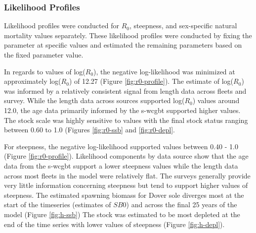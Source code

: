 \documentclass[11pt,
  english,
  a4paper,
]{article}
\begin{document}
\leavevmode\tagmcend\tagstructend\par


\hypertarget{likelihood-profiles}{%
\subsubsection{Likelihood Profiles}\label{likelihood-profiles}}

\leavevmode\tagmcend\tagstructend


Likelihood profiles were conducted for {\(R_0\)\leavevmode\tagmcend\tagstructend}, steepness, and sex-specific natural mortality values separately. These likelihood profiles were conducted by fixing the parameter at specific values and estimated the remaining parameters based on the fixed parameter value.

\leavevmode\tagmcend\tagstructend\par


In regards to values of log({\(R_0\)\leavevmode\tagmcend\tagstructend}), the negative log-likelihood was minimized at approximately log({\(R_0\)\leavevmode\tagmcend\tagstructend}) of 12.27 (Figure \ref{fig:r0-profile}). The estimate of log({\(R_0\)\leavevmode\tagmcend\tagstructend}) was informed by a relatively consistent signal from length data across fleets and survey. While the length data across sources supported log({\(R_0\)\leavevmode\tagmcend\tagstructend}) values around 12.0, the age data primarily informed by the \gls{s-wcgbt} supported higher values. The stock scale was highly sensitive to values with the final stock status ranging between 0.60 to 1.0 (Figures \ref{fig:r0-ssb} and \ref{fig:r0-depl}.

\leavevmode\tagmcend\tagstructend\par


For steepness, the negative log-likelihood supported values between 0.40 - 1.0 (Figure \ref{fig:r0-profile}). Likelihood components by data source show that the age data from the \gls{s-wcgbt} support a lower steepness values while the length data across most fleets in the model were relatively flat. The surveys generally provide very little information concerning steepness but tend to support higher values of steepness. The estimated spawning biomass for Dover sole diverges most at the start of the timeseries (estimates of {\(SB0\)\leavevmode\tagmcend\tagstructend}) and across the final 25 years of the model (Figure \ref{fig:h-ssb}) The stock was estimated to be most depleted at the end of the time series with lower values of steepness (Figure \ref{fig:h-depl}).
\end{document}

